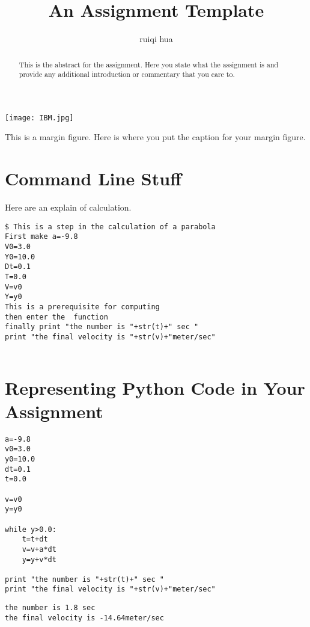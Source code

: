 \documentclass{tufte-handout}
\title{An Assignment Template}
\author[The Academy]{ruiqi  hua}
\begin{document}
\maketitle%
\begin{marginfigure}%
  \texttt{[image: IBM.jpg]}
  \caption{This is a margin figure.  Here is where you put the caption for your margin figure.}
  \label{fig:marginfig}
\end{marginfigure}
\begin{abstract}
\noindent
This is the abstract for the assignment.  Here you state what the assignment is and provide any additional introduction or commentary that you care to.
\end{abstract}

\normalsize

\vspace{1cm}
\section{Command Line Stuff}

Here are an explain of calculation.


\begin{shaded}
\begin{verbatim}
$ This is a step in the calculation of a parabola   
First make a=-9.8
V0=3.0
Y0=10.0
Dt=0.1
T=0.0
V=v0
Y=y0
This is a prerequisite for computing
then enter the  function
finally print "the number is "+str(t)+" sec "
print "the final velocity is "+str(v)+"meter/sec"


\end{verbatim}
\end{shaded}

\vspace{1cm}

\section{Representing Python Code in Your Assignment}


\begin{framed}
\begin{verbatim}
a=-9.8
v0=3.0
y0=10.0
dt=0.1
t=0.0

v=v0
y=y0

while y>0.0:
    t=t+dt
    v=v+a*dt
    y=y+v*dt

print "the number is "+str(t)+" sec "
print "the final velocity is "+str(v)+"meter/sec"

\end{verbatim}
\end{framed}


\begin{shaded}
\begin{verbatim}
the number is 1.8 sec 
the final velocity is -14.64meter/sec\end{verbatim}
\end{shaded}



\end{document}
